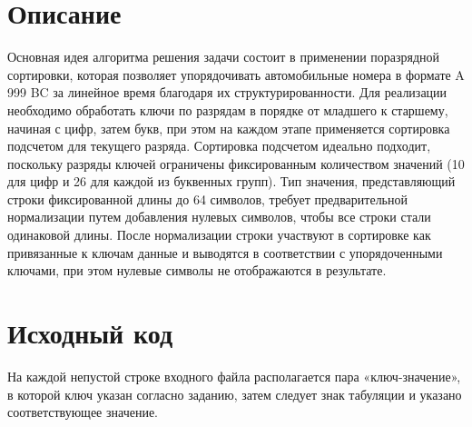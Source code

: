 \section{Описание}
Основная идея алгоритма решения задачи состоит в применении поразрядной сортировки, которая позволяет упорядочивать автомобильные номера в формате A 999 BC за 
линейное время благодаря их структурированности. Для реализации необходимо обработать ключи по разрядам в порядке от младшего к старшему, начиная с цифр, 
затем букв, при этом на каждом этапе применяется сортировка подсчетом для текущего разряда. Сортировка подсчетом идеально подходит, 
поскольку разряды ключей ограничены фиксированным количеством значений (10 для цифр и 26 для каждой из буквенных групп). Тип значения,
представляющий строки фиксированной длины до 64 символов, требует предварительной нормализации путем добавления нулевых символов, 
чтобы все строки стали одинаковой длины. После нормализации строки участвуют в сортировке как привязанные к ключам данные и выводятся в соответствии с упорядоченными ключами,
 при этом нулевые символы не отображаются в результате.

\pagebreak

\section{Исходный код}
На каждой непустой строке входного файла располагается пара «ключ-значение», в которой ключ указан согласно заданию, затем следует знак табуляции и указано соответствующее значение. 

